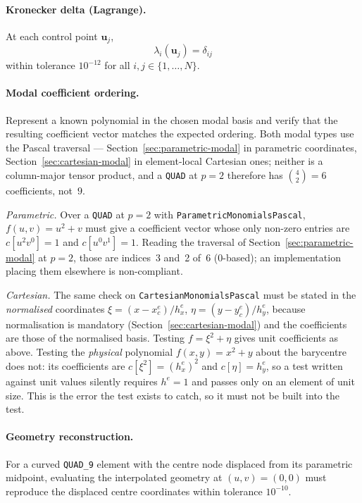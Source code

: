 \documentclass[11pt,letterpaper]{article}
\newif\ifvfourdraft
\newcommand{\vfour}[1]{\ifvfourdraft\textcolor{v4violet}{#1}\else#1\fi}
\begin{document}
\paragraph{Kronecker delta (Lagrange).}
At each control point $\mathbf{u}_j$,
\begin{equation}
  \lambda_i(\mathbf{u}_j) = \delta_{ij}
\end{equation}
within tolerance $10^{-12}$ for all $i, j \in \{1, \ldots, N\}$.

\paragraph{Modal coefficient ordering.}
Represent a known polynomial in the chosen modal basis and verify that the resulting
coefficient vector matches the expected ordering.  Both modal types use the Pascal
traversal --- Section~\ref{sec:parametric-modal} in parametric coordinates,
Section~\ref{sec:cartesian-modal} in element-local Cartesian ones; \vfour{neither
is a column-major tensor product, and a \texttt{QUAD} at $p=2$ therefore has
$\binom{4}{2}=6$ coefficients, not~$9$.}

\vfour{\emph{Parametric.}  Over a \texttt{QUAD} at $p=2$ with
\texttt{ParametricMonomialsPascal}, $f(u,v) = u^2 + v$ must give a coefficient
vector whose only non-zero entries are $c[u^2v^0]=1$ and $c[u^0v^1]=1$.  Reading
the traversal of Section~\ref{sec:parametric-modal} at $p=2$, those are indices~3
and~2 of~6 (0-based); an implementation placing them elsewhere is non-compliant.}

\vfour{\emph{Cartesian.}  The same check on \texttt{CartesianMonomialsPascal}
must be stated in the \emph{normalised} coordinates
$\xi = (x-x^e_c)/h^e_x$, $\eta = (y-y^e_c)/h^e_y$, because normalisation is
mandatory (Section~\ref{sec:cartesian-modal}) and the coefficients are those of
the normalised basis.  Testing $f = \xi^2 + \eta$ gives unit coefficients as
above.  Testing the \emph{physical} polynomial $f(x,y) = x^2 + y$ about the
barycentre does not: its coefficients are $c[\xi^2] = (h^e_x)^2$ and
$c[\eta] = h^e_y$, so a test written against unit values silently requires
$h^e = 1$ and passes only on an element of unit size.  This is the error the test
exists to catch, so it must not be built into the test.}

\paragraph{Geometry reconstruction.}
For a curved \texttt{QUAD\_9} element with the centre node displaced from its parametric
midpoint, evaluating the interpolated geometry at $(u,v)=(0,0)$ must reproduce the displaced
centre coordinates within tolerance $10^{-10}$.
\end{document}
